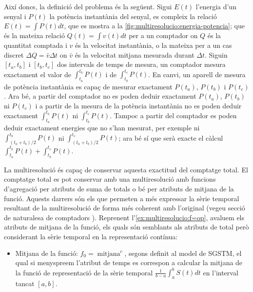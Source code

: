 \begin{example}
Així doncs, la definició del problema és la següent.  Sigui $E(t)$
l'energia d'un senyal i $P(t)$ la potència instantània del senyal, es
compleix la relació $E(t)=\int P(t) dt$, que es mostra a la
\autoref{fig:multiresolucio:energia-potencia}; que és la mateixa
relació $Q(t)=\int v(t) dt$ per a un comptador on $Q$ és la quantitat
comptada i $v$ és la velocitat instantània, o la mateixa per a un cas
discret $\Delta Q = \bar{v} \Delta t$ on $\bar{v}$ és la velocitat
mitjana mesurada durant $\Delta t$. %
  Siguin
  $[t_a,t_b]$ i $[t_b,t_c]$ dos intervals de temps de mesura, un
  comptador mesura exactament el valor de $\int_{t_a}^{t_b} P(t)$ i de
  $\int_{t_b}^{t_c} P(t)$. En canvi, un aparell de mesura de potència
  instantània es capaç de mesurar exactament $P(t_a)$, $P(t_b)$ i
  $P(t_c)$. Ara bé, a partir del comptador no es poden deduir
  exactament $P(t_a)$, $P(t_b)$ ni $P(t_c)$ i a partir de la mesura de
  la potència instantània no es poden deduir exactament
  $\int_{t_a}^{t_b} P(t)$ ni $\int_{t_b}^{t_c} P(t)$. Tampoc a partir
  del comptador es poden deduir exactament energies que no s'han
  mesurat, per exemple ni $\int_{(t_a+t_b)/2}^{t_b} P(t)$ ni
  $\int_{(t_a+t_b)/2}^{t_c} P(t)$; ara bé sí que serà exacte el càlcul
  $\int_{t_a}^{t_b} P(t)+\int_{t_b}^{t_c} P(t)$.
  

  La multiresolució és capaç de conservar aquesta exactitud del
  comptatge total.  El comptatge total es pot conservar amb una
  multiresolució amb funcions d'agregació per atributs de suma de
  totals o bé per atributs de mitjana de la funció. Aquests darrers
  són els que permeten a més expressar la sèrie temporal resultant de
  la multiresolució de forma més coherent amb l'original (vegeu secció
  de naturalesa de comptadors ). Reprenent
  l'\autoref{ex:multiresolucio:f=op}, avaluem els atributs de mitjana
  de la funció, els quals són semblants als atributs de total però
  considerant la sèrie temporal en la representació contínua:
  
  \begin{itemize}

  \item Mitjana de la funció:
    $f_0=\operatorname{mitjana}^c$, segons definit al model de \gls{SGSTM}, el qual si
    menyspreem l'atribut de temps es correspon a calcular la mitjana
    de la funció de representació de la sèrie temporal $\frac{1}{b-a}
    \int_{a}^{b} S(t)dt$ en l'interval tancat $[a,b]$.


\end{itemize}
\end{example}
